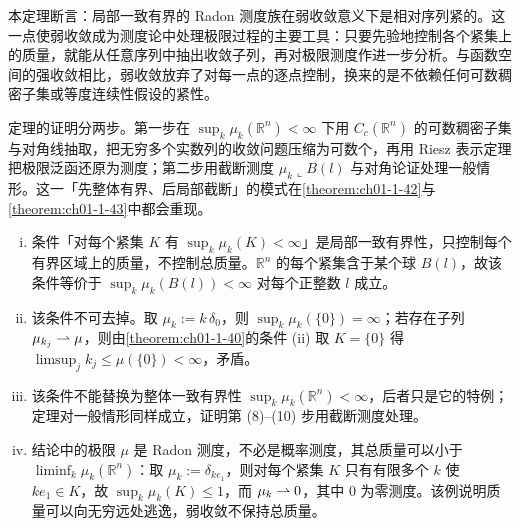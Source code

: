 \documentclass[../../main.tex]{subfiles}%
\begin{document}
\begin{remark}\label{remark:ch01-thm-1-41-动机}
本定理断言：局部一致有界的 Radon 测度族在弱收敛意义下是相对序列紧的。这一点使弱收敛成为测度论中处理极限过程的主要工具：只要先验地控制各个紧集上的质量，就能从任意序列中抽出收敛子列，再对极限测度作进一步分析。与函数空间的强收敛相比，弱收敛放弃了对每一点的逐点控制，换来的是不依赖任何可数稠密子集或等度连续性假设的紧性。

定理的证明分两步。第一步在 $\sup_k\mu_k(\mathbb{R}^n)<\infty$ 下用 $C_c(\mathbb{R}^n)$ 的可数稠密子集与对角线抽取，把无穷多个实数列的收敛问题压缩为可数个，再用 Riesz 表示定理把极限泛函还原为测度；第二步用截断测度 $\mu_k\llcorner B(l)$ 与对角论证处理一般情形。这一「先整体有界、后局部截断」的模式在\cref{theorem:ch01-1-42}与\cref{theorem:ch01-1-43}中都会重现。%
\end{remark}

\begin{remark}\label{remark:ch01-thm-1-41-条件}
\begin{enumerate}[(i)]
\item 条件「对每个紧集 $K$ 有 $\sup_k\mu_k(K)<\infty$」是局部一致有界性，只控制每个有界区域上的质量，不控制总质量。$\mathbb{R}^n$ 的每个紧集含于某个球 $B(l)$，故该条件等价于 $\sup_k\mu_k(B(l))<\infty$ 对每个正整数 $l$ 成立。
\item 该条件不可去掉。取 $\mu_k:=k\,\delta_0$，则 $\sup_k\mu_k(\{0\})=\infty$；若存在子列 $\mu_{k_j}\rightharpoonup\mu$，则由\cref{theorem:ch01-1-40}的条件 (ii) 取 $K=\{0\}$ 得 $\limsup_j k_j\leqslant\mu(\{0\})<\infty$，矛盾。%
\item 该条件不能替换为整体一致有界性 $\sup_k\mu_k(\mathbb{R}^n)<\infty$，后者只是它的特例；定理对一般情形同样成立，证明第 (8)–(10) 步用截断测度处理。
\item 结论中的极限 $\mu$ 是 Radon 测度，不必是概率测度，其总质量可以小于 $\liminf_k\mu_k(\mathbb{R}^n)$：取 $\mu_k:=\delta_{k e_1}$，则对每个紧集 $K$ 只有有限多个 $k$ 使 $k e_1\in K$，故 $\sup_k\mu_k(K)\leqslant1$，而 $\mu_k\rightharpoonup0$，其中 $0$ 为零测度。该例说明质量可以向无穷远处逃逸，弱收敛不保持总质量。
\end{enumerate}
\end{remark}
\end{document}
